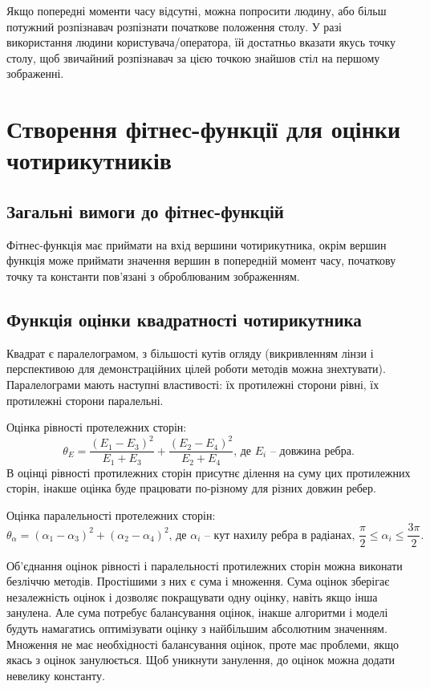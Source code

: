 \documentclass[a4paper,14pt]{report}
\begin{document}
Якщо попередні моменти часу відсутні, можна попросити людину, або більш потужний розпізнавач розпізнати початкове положення столу. 
У разі використання людини користувача/оператора, їй достатньо вказати якусь точку столу, щоб звичайний розпізнавач за цією точкою знайшов стіл на першому зображенні. 

\section{Створення фітнес-функції для оцінки чотирикутників}
\subsection{Загальні вимоги до фітнес-функцій}
Фітнес-функція має приймати на вхід вершини чотирикутника, окрім вершин функція може приймати значення вершин в попередній момент часу, початкову точку та константи пов'язані з оброблюваним зображенням.

\subsection{Функція оцінки квадратності чотирикутника}
Квадрат є паралелограмом, з більшості кутів огляду (викривленням лінзи і перспективою для демонстраційних цілей роботи методів можна знехтувати). 
Паралелограми мають наступні властивості: їх протилежні сторони рівні, їх протилежні сторони паралельні.

Оцінка рівності протележних сторін:
\[
\theta_E = \frac{(E_1-E_3)^2}{E_1+E_3} + \frac{(E_2-E_4)^2}{E_2+E_4}\text{, де }E_i\text{ -- довжина ребра.}
\]
В оцінці рівності протилежних сторін присутнє ділення на суму цих протилежних сторін, інакше оцінка буде працювати по-різному для різних довжин ребер.


Оцінка паралельності протележних сторін:
\[
\theta_\alpha = (\alpha_1-\alpha_3)^2 + (\alpha_2 - \alpha_4)^2\text{, де }\alpha_i\text{ -- кут нахилу ребра в радіанах, }\frac{\pi}{2} \leq \alpha_i \leq \frac{3\pi}{2}.
\]

Об'єднання оцінок рівності і паралельності протилежних сторін можна виконати безліччю методів. Простішими з них є сума і множення. 
Сума оцінок зберігає незалежність оцінок і дозволяє покращувати одну оцінку, навіть якщо інша занулена. Але сума потребує балансування оцінок, інакше алгоритми і моделі будуть намагатись оптимізувати оцінку з найбільшим абсолютним значенням. 
Множення не має необхідності балансування оцінок, проте має проблеми, якщо якась з оцінок занулюється. Щоб уникнути занулення, до оцінок можна додати невелику константу.
\end{document}
